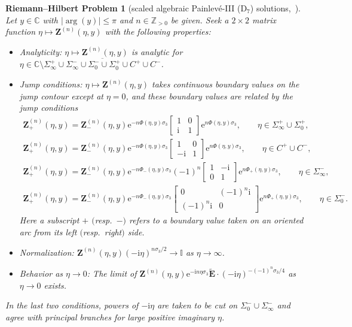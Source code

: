 \documentclass[pdftex]{sigma}
\numberwithin{equation}{section}
\newtheorem{rhp}[Theorem]{Riemann--Hilbert Problem}
 { \theoremstyle{definition}
\newtheorem{Definition}[Theorem]{Definition}
\newtheorem{Note}[Theorem]{Note}
\newtheorem{Example}[Theorem]{Example}
\newtheorem{Remark}[Theorem]{Remark} }
\begin{document}
\begin{rhp}[{scaled algebraic Painlev\'e-III (D$_7$) solutions,~\cite[Section~4.1]{BuckinghamM22}}]\label{rhp:Z}
Let $y\in\mathbb{C}$ with $|\arg(y)|\le\pi$ and $n\in\mathbb{Z}_{>0}$ be given. Seek a $2\times 2$ matrix function $\eta\mapsto\mathbf{Z}^{(n)}(\eta,y)$ with the following properties:
\begin{itemize}\itemsep=0pt
\item[]Analyticity: $\eta\mapsto\mathbf{Z}^{(n)}(\eta,y)$ is analytic for $\eta\in\mathbb{C}\setminus \overline{\Sigma_\infty^+\cup\Sigma_\infty^-\cup\Sigma_0^-\cup\Sigma_0^+\cup C^+\cup C^-}$.
\item[]Jump conditions: $\eta\mapsto \mathbf{Z}^{(n)}(\eta,y)$ takes continuous boundary values on the jump contour except at $\eta=0$, and these boundary values are related by the jump conditions
\begin{gather*}
\mathbf{Z}_+^{(n)}(\eta,y)=\mathbf{Z}^{(n)}_-(\eta,y)\mathrm{e}^{-n\Phi(\eta,y)\sigma_3}\begin{bmatrix}1&0\\\mathrm{i} & 1\end{bmatrix}\mathrm{e}^{n\Phi(\eta,y)\sigma_3},\qquad\eta\in\Sigma_\infty^+\cup\Sigma_0^+,
\\
\mathbf{Z}_+^{(n)}(\eta,y)=\mathbf{Z}^{(n)}_-(\eta,y)\mathrm{e}^{-n\Phi(\eta,y)\sigma_3}\begin{bmatrix}1&0\\-\mathrm{i} & 1\end{bmatrix}\mathrm{e}^{n\Phi(\eta,y)\sigma_3},\qquad\eta\in C^+\cup C^-,
\\
\mathbf{Z}_+^{(n)}(\eta,y)=\mathbf{Z}^{(n)}_-(\eta,y)\mathrm{e}^{-n\Phi_-(\eta,y)\sigma_3}(-1)^n\begin{bmatrix}1&-\mathrm{i} \\ 0 & 1\end{bmatrix}\mathrm{e}^{n\Phi_+(\eta,y)\sigma_3},\qquad\eta\in\Sigma_\infty^-,
\\
\mathbf{Z}_+^{(n)}(\eta,y)=\mathbf{Z}^{(n)}_-(\eta,y)\mathrm{e}^{-n\Phi_-(\eta,y)\sigma_3}\begin{bmatrix}0 & (-1)^n\mathrm{i}\\ (-1)^n\mathrm{i} & 0\end{bmatrix}
\mathrm{e}^{n\Phi_+(\eta,y)\sigma_3},\qquad\eta\in\Sigma_0^-.
\end{gather*}
Here a subscript $+$ $($resp.~$-)$ refers to a
boundary value taken on an oriented arc from its left $($resp.\ right$)$ side.
\item[]Normalization: $\mathbf{Z}^{(n)}(\eta,y)(-\mathrm{i}\eta)^{n\sigma_3/2}\to\mathbb{I}$ as $\eta\to\infty$.
\item[]Behavior as $\eta\to 0$: The limit of $\mathbf{Z}^{(n)}(\eta,y)\mathrm{e}^{-\mathrm{i} n\eta\sigma_3}\widetilde{\mathbf{E}}\cdot(-\mathrm{i}\eta)^{-(-1)^n\sigma_3/4}$ as $\eta\to 0$ exists.
\end{itemize}
In the last two conditions, powers of $-\mathrm{i}\eta$ are taken to be cut on $\Sigma_0^-\cup\Sigma_\infty^-$ and agree with principal branches for large positive imaginary $\eta$.
\end{rhp}
\end{document}
